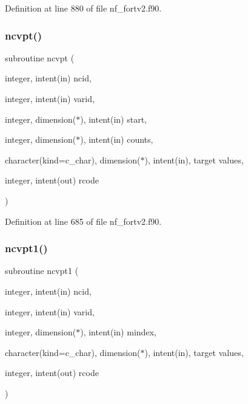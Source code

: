 Definition at line 880 of file nf\+\_\+fortv2.\+f90.

\mbox{\label{nf__fortv2_8f90_a0e80dc4b1c7ad7772f48f31480a61237}} 
\subsubsection{\texorpdfstring{ncvpt()}{ncvpt()}}
{\footnotesize\ttfamily subroutine ncvpt (\begin{DoxyParamCaption}\item[{integer, intent(in)}]{ncid,  }\item[{integer, intent(in)}]{varid,  }\item[{integer, dimension($\ast$), intent(in)}]{start,  }\item[{integer, dimension($\ast$), intent(in)}]{counts,  }\item[{character(kind=c\+\_\+char), dimension($\ast$), intent(in), target}]{values,  }\item[{integer, intent(out)}]{rcode }\end{DoxyParamCaption})}



Definition at line 685 of file nf\+\_\+fortv2.\+f90.

\mbox{\label{nf__fortv2_8f90_a193fa468237c9fe5b4c4182a49ae0030}} 
\subsubsection{\texorpdfstring{ncvpt1()}{ncvpt1()}}
{\footnotesize\ttfamily subroutine ncvpt1 (\begin{DoxyParamCaption}\item[{integer, intent(in)}]{ncid,  }\item[{integer, intent(in)}]{varid,  }\item[{integer, dimension($\ast$), intent(in)}]{mindex,  }\item[{character(kind=c\+\_\+char), dimension($\ast$), intent(in), target}]{values,  }\item[{integer, intent(out)}]{rcode }\end{DoxyParamCaption})}



